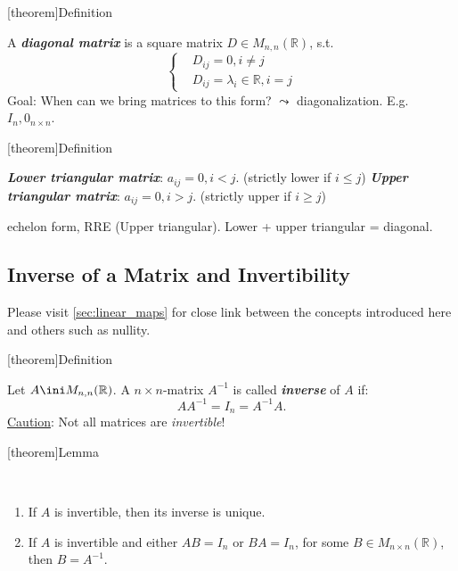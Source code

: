 \documentclass[12pt]{report}
\theoremstyle{definition}
\begin{document}
[theorem]{Definition}
\begin{diagonal matrix}
    A \textbf{\emph{diagonal matrix}} is a square matrix $D \in M_{n,n}(\mathbb{R})$, s.t.\[
        \left\{
            \begin{align*}
                & D_{ij} = 0, i \neq j \\
                & D_{ij} = \lambda_i \in \mathbb{R}, i = j
            \end{align*}
        \right.
    \]
    Goal: When can we bring matrices to this form? $\leadsto$ diagonalization.
    E.g. $I_n, 0_{n\times n}$.
\end{diagonal matrix}

[theorem]{Definition}
\begin{upper and lower triangular matrix}
    \textbf{\emph{Lower triangular matrix}}: $a_{ij} = 0, i < j$. (strictly lower if $i \le j$)
    \textbf{\emph{Upper triangular matrix}}: $a_{ij} = 0, i > j$. (strictly upper if $i \ge j$)
\end{upper and lower triangular matrix}

\begin{ex}
    echelon form, RRE (Upper triangular).
    Lower + upper triangular = diagonal.
\end{ex}

\subsection{Inverse of a Matrix and Invertibility}\label{sec:inverse_of_matrix}

Please visit \autoref{sec:linear_maps} for close link between the concepts
introduced here and others such as nullity.

[theorem]{Definition}
\begin{inverse square matrix}
    Let $A \ini M_{n,n}(\mathbb{R})$. A $n \times n$-matrix $A^{-1}$ is called \textbf{\emph{inverse}}
    of $A$ if:\[
        AA^{-1} = I_n = A^{-1}A.
    \]
    \underline{Caution}: Not all matrices are \emph{invertible}!
\end{inverse square matrix}

[theorem]{Lemma}
\begin{lemma Of inverse matrix}
    \,

    \begin{enumerate}[label = (\arabic*)]
        \item If $A$ is invertible, then its inverse is unique.
        \item If $A$ is invertible and either $AB = I_n$ or $BA = I_n$, for some $B \in M_{n\times n}(\mathbb{R})$,
            then $B = A^{-1}$.
    \end{enumerate}
    
\end{lemma Of inverse matrix}
\end{document}
